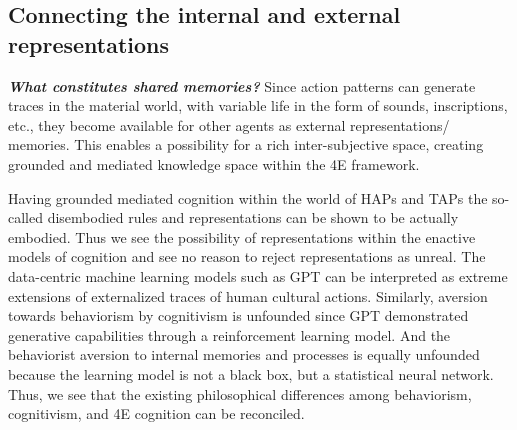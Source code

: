 \subsection{Connecting the internal and external representations} \textbf{\textit{What constitutes shared memories?}} Since action patterns can generate traces in the material world, with variable life in the form of sounds, inscriptions, etc., they become available for other agents as external representations/ memories. This enables a possibility for a rich inter-subjective space, creating grounded and mediated knowledge space within the 4E framework.

Having grounded mediated cognition within the world of HAPs and TAPs the so-called disembodied rules and representations can be shown to be actually embodied. Thus we see the possibility of representations within the enactive models of cognition and see no reason to reject representations as unreal. The data-centric machine learning models such as GPT can be interpreted as extreme extensions of externalized traces of human cultural actions. Similarly, aversion towards behaviorism by cognitivism is unfounded since GPT demonstrated generative capabilities through a reinforcement learning model. And the behaviorist aversion to internal memories and processes is equally unfounded because the learning model is not a black box, but a statistical neural network. Thus, we see that the existing philosophical differences among behaviorism, cognitivism, and 4E cognition can be reconciled.
